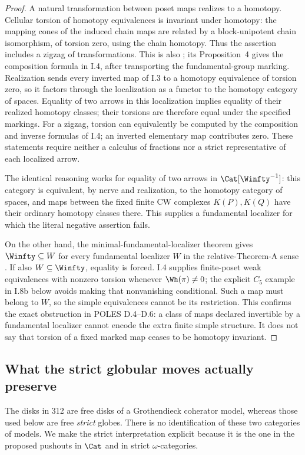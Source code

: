 \begin{proof}
A natural transformation between poset maps realizes to a homotopy.
Cellular torsion of homotopy equivalences is invariant under homotopy:
the mapping cones of the induced chain maps are related by a
block-unipotent chain isomorphism, of torsion zero, using the chain
homotopy. Thus the assertion includes a zigzag of transformations.
This is also \cite[Proposition~1]{I_LurieWhiteheadII}; its
Proposition~4 gives the composition formula in I.4, after transporting
the fundamental-group marking.
Realization sends every inverted map of I.3 to a homotopy equivalence
of torsion zero, so it factors through the localization as a functor
to the homotopy category of spaces. Equality of two arrows in this
localization implies equality of their realized homotopy classes;
their torsions are therefore equal under the specified markings.
For a zigzag, torsion can equivalently be computed by the composition
and inverse formulas of I.4; an inverted elementary map contributes
zero. These statements require neither a calculus of fractions nor a
strict representative of each localized arrow.

The identical reasoning works for equality of two arrows in
$\Cat[\Winfty^{-1}]$: this category is equivalent, by nerve and
realization, to the homotopy category of spaces, and maps between the
fixed finite CW complexes $K(P),K(Q)$ have their ordinary homotopy
classes there. This supplies a fundamental localizer for which the
literal negative assertion fails.

On the other hand, the minimal-fundamental-localizer theorem gives
$\Winfty\subseteq W$ for every fundamental localizer $W$ in the
relative-Theorem-A sense \cite[Corollary~4.2.19]{I_Cisinski2006}.
If also $W\subseteq\Winfty$, equality is
forced. I.4 supplies finite-poset weak equivalences with nonzero
torsion whenever $\Wh(\pi)\ne0$; the explicit $C_5$ example in I.8b
below avoids making that nonvanishing conditional. Such a map must
belong to $W$, so the simple equivalences cannot be its restriction.
This confirms the exact obstruction in POLES D.4--D.6: a class of
maps declared invertible by a fundamental localizer cannot encode the
extra finite simple structure. It does not say that torsion of a
fixed marked map ceases to be homotopy invariant.
\end{proof}

\subsection{What the strict globular moves actually preserve}
The disks in 312 are free disks of a Grothendieck coherator model,
whereas those used below are free \emph{strict} globes. There is no
identification of these two categories of models. We make the strict
interpretation explicit because it is the one in the proposed
pushouts in $\Cat$ and in strict $\omega$-categories.

